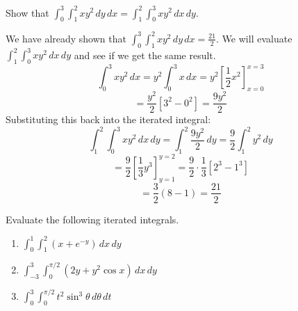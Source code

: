 \begin{Exercise}[title = {Order of Evaluating Iterated Integrals}, label = iterate_1]
Show that $\int_0^3 \int_1^2 x y^2\,dy\,dx = \int_1^2 \int_0^3 x y^2 \,dx\,dy$.
\end{Exercise}

\begin{Answer}[ref = iterate_1]
We have already shown that $\int_0^3 \int_1^2 x y^2\,dy\,dx = \frac{21}{2}$. 
We will evaluate $\int_1^2 \int_0^3 x y^2 \,dx\,dy$ and see if we get the same 
result. 
$$\int_0^3 x y^2 \,dx = y^2 \int_0^3 x\,dx = y^2 \left[ \frac{1}{2}x^2 \right]_
{x = 0}^{x = 3}$$
$$= \frac{y^2}{2} \left[ 3^2 - 0^2 \right] = \frac{9y^2}{2}$$
Substituting this back into the iterated integral:
$$\int_1^2 \int_0^3 x y^2 \,dx\,dy = \int_1^2 \frac{9y^2}{2}\,dy = \frac{9}{2} 
\int_1^2 y^2 \,dy$$
$$= \frac{9}{2} \left[ \frac{1}{3}y^3 \right]_{y = 1}^{y = 2} = \frac{9}{2} 
\cdot \frac{1}{3} \left[ 2^3 - 1^3 \right]$$
$$= \frac{3}{2}(8 - 1) = \frac{21}{2}$$
\end{Answer}

\begin{Exercise}[title = {Evaluating Iterated Integrals}, label = iterate_2]
Evaluate the following iterated integrals.
\begin{enumerate}
\item $\int_0^1 \int_1^2 \left( x + e^{-y} \right)\,dx\,dy$
\item $\int_{-3}^3 \int_{0}^{\pi/2} \left( 2y + y^2 \cos{x} \right)\,dx\,dy$
\item $\int_0^3 \int_0^{\pi/2} t^2 \sin^3{\theta}\,d\theta\,dt$
\end{enumerate}
\vspace{100mm}
\end{Exercise}

